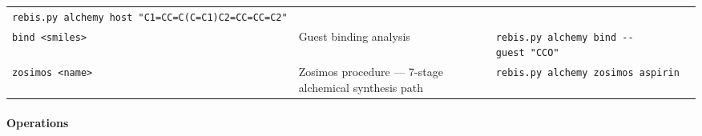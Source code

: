 \begin{longtable}[]{@{}lll@{}}
\begin{minipage}[t]{0.24\columnwidth}
\texttt{rebis.py\ alchemy\ host\ "C1=CC=C(C=C1)C2=CC=CC=C2"}\strut
\end{minipage}\tabularnewline
\begin{minipage}[t]{0.32\columnwidth}\raggedright
\texttt{bind\ \textless{}smiles\textgreater{}}\strut
\end{minipage} & \begin{minipage}[t]{0.35\columnwidth}\raggedright
Guest binding analysis\strut
\end{minipage} & \begin{minipage}[t]{0.24\columnwidth}\raggedright
\texttt{rebis.py\ alchemy\ bind\ -\/-guest\ "CCO"}\strut
\end{minipage}\tabularnewline
\begin{minipage}[t]{0.32\columnwidth}\raggedright
\texttt{zosimos\ \textless{}name\textgreater{}}\strut
\end{minipage} & \begin{minipage}[t]{0.35\columnwidth}\raggedright
Zosimos procedure --- 7-stage alchemical synthesis path\strut
\end{minipage} & \begin{minipage}[t]{0.24\columnwidth}\raggedright
\texttt{rebis.py\ alchemy\ zosimos\ aspirin}\strut
\end{minipage}\tabularnewline
\bottomrule
\end{longtable}

\hypertarget{operations}{%
\paragraph{Operations}\label{operations}}

